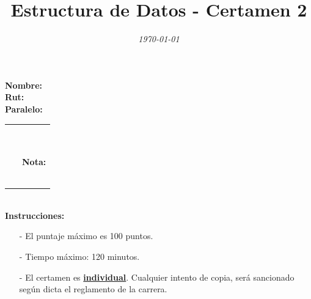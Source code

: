 \documentclass{exam}
\title{\LARGE\color{azul}\textbf{Estructura de Datos - Certamen 2 }}
\author{\smallsize \color{gray}{Profesor: } \color{black}{\textbf{Eduardo Godoy}}}
\date{\normalsize \em \today}
\begin{document}

\maketitle

\begin{multicols}{2}
  \begin{flushleft}
    \textbf{Nombre:} \\
    \vspace*{2mm}
    \textbf{Rut:} \\
    \vspace*{2mm}
    \textbf{Paralelo:}
  \end{flushleft}
  \begin{center}
    \begin{table}[H]
      \begin{tabular}{p{4cm}|p{3cm}|}
        \arrayrulecolor{gray!50}\cline{2-2} ~ & {\em {\scriptsize \color{gray!50}{Puntaje:}}}\\
         & ~ \\
         ~ & \textbf{Nota:}
        \\ & ~ \\
        \arrayrulecolor{gray!50}\cline{2-2}
      \end{tabular}
    \end{table}
  \end{center}
\end{multicols}

\noindent
\textbf{\\Instrucciones:}
\begin{itemize}
\item[-] El puntaje máximo  es 100 puntos.
\item[-] Tiempo máximo: 120 minutos.
\item[-] El certamen es \underline{\textbf{individual}}. Cualquier intento de copia, será sancionado según dicta el reglamento de la carrera.
\end{itemize}
\end{document}
